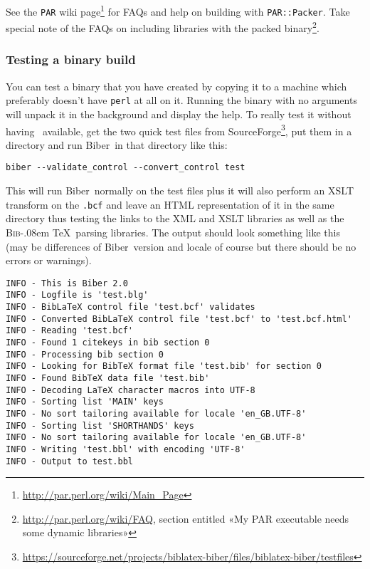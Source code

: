 \documentclass{ltxdockit}
\def\BibTeX{\textsc{Bib}\kern-.08em \TeX}
\newcommand*{\biber}{Biber\xspace}
\begin{document}
See the \verb+PAR+ wiki
page\footnote{\url{http://par.perl.org/wiki/Main_Page}} for FAQs and help
on building with \verb+PAR::Packer+. Take special note of the FAQs on
including libraries with the packed
binary\footnote{\url{http://par.perl.org/wiki/FAQ}, section entitled «My
  PAR executable needs some dynamic libraries»}.

\subsubsection{Testing a binary build}
You can test a binary that you have created by copying it to a machine
which preferably doesn't have \verb+perl+ at all on it. Running the binary with no
arguments will unpack it in the background and display the help. To really
test it without having \latex\ available, get the two quick test files from
SourceForge\footnote{\url{https://sourceforge.net/projects/biblatex-biber/files/biblatex-biber/testfiles}},
put them in a directory and run \biber\ in that directory like this:

\begin{verbatim}
biber --validate_control --convert_control test
\end{verbatim}

\noindent This will run \biber\ normally on the test files plus it
will also perform an XSLT transform on the \verb+.bcf+ and
leave an HTML representation of it in the same directory thus testing the
links to the XML and XSLT libraries as well as the \BibTeX\ parsing
libraries. The output should look something like this (may be differences
of \biber\ version and locale of course but there should be no errors
or warnings).

\begin{verbatim}
INFO - This is Biber 2.0
INFO - Logfile is 'test.blg'
INFO - BibLaTeX control file 'test.bcf' validates
INFO - Converted BibLaTeX control file 'test.bcf' to 'test.bcf.html'
INFO - Reading 'test.bcf'
INFO - Found 1 citekeys in bib section 0
INFO - Processing bib section 0
INFO - Looking for BibTeX format file 'test.bib' for section 0
INFO - Found BibTeX data file 'test.bib'
INFO - Decoding LaTeX character macros into UTF-8
INFO - Sorting list 'MAIN' keys
INFO - No sort tailoring available for locale 'en_GB.UTF-8'
INFO - Sorting list 'SHORTHANDS' keys
INFO - No sort tailoring available for locale 'en_GB.UTF-8'
INFO - Writing 'test.bbl' with encoding 'UTF-8'
INFO - Output to test.bbl
\end{verbatim}
\end{document}
